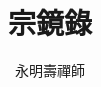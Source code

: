 \documentclass[a4paper,UTF8]{ctexbook}
\begin{document}
\title{宗鏡錄}
\author{永明壽禪師}
\date{}
\maketitle

\tableofcontents







\printindex
\end{document}
